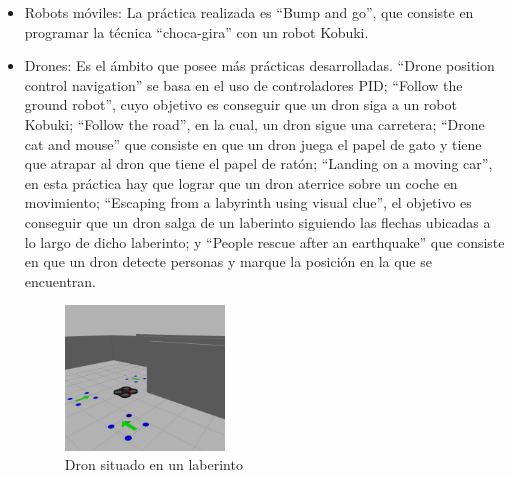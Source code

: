 \begin{itemize}
	\item Robots móviles: La práctica realizada es  ``Bump and go'', que consiste en programar la técnica ``choca-gira''  con un robot Kobuki.

	\item Drones: Es el ámbito que posee más prácticas desarrolladas. ``Drone position control navigation'' se basa en el uso de controladores PID; ``Follow the ground robot'', cuyo objetivo es conseguir que un dron siga a un robot Kobuki; ``Follow the road'', en la cual, un dron sigue una carretera; ``Drone cat and mouse'' que consiste en que un dron juega el papel de gato y tiene que atrapar al dron que tiene el papel de ratón; ``Landing on a moving car'', en esta práctica hay que lograr que un dron aterrice sobre un coche en movimiento; ``Escaping from a labyrinth using visual clue'', el objetivo es conseguir que un dron salga de un laberinto siguiendo las flechas ubicadas a lo largo de dicho laberinto; y ``People rescue after an earthquake'' que consiste en que un dron detecte personas y marque la posición en la que se encuentran.
\begin{figure}[H]
  	\begin{center}
    	\includegraphics[width=0.4\textwidth]{figures/Introduccion/dron.jpg}
			\caption{Dron situado en un laberinto}
			\label{fig.dron}
			\end{center}
	\end{figure}
\end{itemize}
